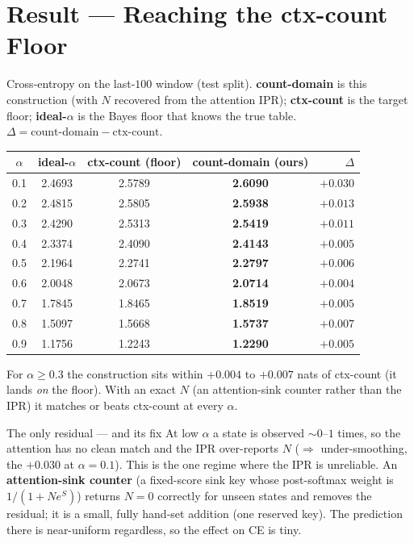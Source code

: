 \documentclass[11pt]{article}
\begin{document}
\section{Result --- Reaching the ctx-count Floor}
Cross-entropy on the last-$100$ window (test split). \textbf{count-domain} is this construction
(with $N$ recovered from the attention IPR); \textbf{ctx-count} is the target floor; \textbf{ideal-$\alpha$}
is the Bayes floor that knows the true table. $\Delta=\text{count-domain}-\text{ctx-count}$.
\begin{center}\small
\begin{tabular}{@{}ccccr@{}}
\toprule
$\alpha$ & ideal-$\alpha$ & ctx-count (floor) & \textbf{count-domain (ours)} & $\Delta$\\
\midrule
0.1 & 2.4693 & 2.5789 & \textbf{2.6090} & $+0.030$\\
0.2 & 2.4815 & 2.5805 & \textbf{2.5938} & $+0.013$\\
0.3 & 2.4290 & 2.5313 & \textbf{2.5419} & $+0.011$\\
0.4 & 2.3374 & 2.4090 & \textbf{2.4143} & $+0.005$\\
0.5 & 2.1964 & 2.2741 & \textbf{2.2797} & $+0.006$\\
0.6 & 2.0048 & 2.0673 & \textbf{2.0714} & $+0.004$\\
0.7 & 1.7845 & 1.8465 & \textbf{1.8519} & $+0.005$\\
0.8 & 1.5097 & 1.5668 & \textbf{1.5737} & $+0.007$\\
0.9 & 1.1756 & 1.2243 & \textbf{1.2290} & $+0.005$\\
\bottomrule
\end{tabular}
\end{center}
For $\alpha\ge0.3$ the construction sits within $+0.004$ to $+0.007$ nats of ctx-count (it lands
\emph{on} the floor). With an exact $N$ (an attention-sink counter rather than the IPR) it matches or
beats ctx-count at every $\alpha$.

\begin{invbox}{The only residual --- and its fix}
At low $\alpha$ a state is observed $\sim0$--$1$ times, so the attention has no clean match and the IPR
over-reports $N$ ($\Rightarrow$ under-smoothing, the $+0.030$ at $\alpha{=}0.1$). This is the one regime
where the IPR is unreliable. An \textbf{attention-sink counter} (a fixed-score sink key whose post-softmax
weight is $1/(1+N e^{S})$) returns $N=0$ correctly for unseen states and removes the residual; it is a
small, fully hand-set addition (one reserved key). The prediction there is near-uniform regardless, so
the effect on CE is tiny.
\end{invbox}
\end{document}
